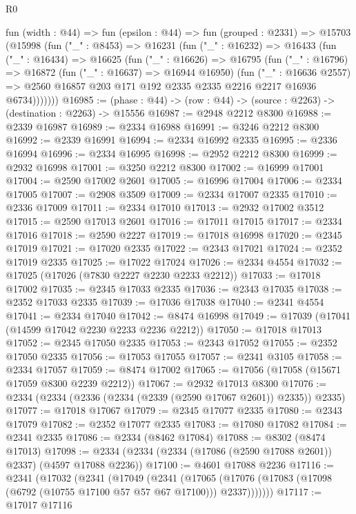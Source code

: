 \begin{lexlean}{R0}
\begin{coremodule}
  fun (width : @44) =>
  fun (epsilon : @44) =>
  fun (grouped : @2331) =>
  @15703
    (@15998
      (fun ("_" : @8453) =>
      @16231
        (fun ("_" : @16232) =>
        @16433
          (fun ("_" : @16434) =>
          @16625
            (fun ("_" : @16626) =>
            @16795
              (fun ("_" : @16796) =>
              @16872
                (fun ("_" : @16637) => @16944 @16950)
                (fun ("_" : @16636 @2557) =>
                @2560 @16857 @203 @171 @192 @2335 @2335 @2216 @2217 @16936 @6734)))))))
@16985 := (phase : @44) -> (row : @44) -> (source : @2263) -> (destination : @2263) -> @15556
@16987 := @2948 @2212 @8300
@16988 := @2339 @16987
@16989 := @2334 @16988
@16991 := @3246 @2212 @8300
@16992 := @2339 @16991
@16994 := @2334 @16992 @2335
@16995 := @2336 @16994
@16996 := @2334 @16995
@16998 := @2952 @2212 @8300
@16999 := @2932 @16998
@17001 := @3250 @2212 @8300
@17002 := @16999 @17001
@17004 := @2590 @17002 @2601
@17005 := @16996 @17004
@17006 := @2334 @17005
@17007 := @2908 @3509
@17009 := @2334 @17007 @2335
@17010 := @2336 @17009
@17011 := @2334 @17010
@17013 := @2932 @17002 @3512
@17015 := @2590 @17013 @2601
@17016 := @17011 @17015
@17017 := @2334 @17016
@17018 := @2590 @2227
@17019 := @17018 @16998
@17020 := @2345 @17019
@17021 := @17020 @2335
@17022 := @2343 @17021
@17024 := @2352 @17019 @2335
@17025 := @17022 @17024
@17026 := @2334 @4554
@17032 := @17025 (@17026 (@7830 @2227 @2230 @2233 @2212))
@17033 := @17018 @17002
@17035 := @2345 @17033 @2335
@17036 := @2343 @17035
@17038 := @2352 @17033 @2335
@17039 := @17036 @17038
@17040 := @2341 @4554
@17041 := @2334 @17040
@17042 := @8474 @16998
@17049 := @17039 (@17041 (@14599 @17042 @2230 @2233 @2236 @2212))
@17050 := @17018 @17013
@17052 := @2345 @17050 @2335
@17053 := @2343 @17052
@17055 := @2352 @17050 @2335
@17056 := @17053 @17055
@17057 := @2341 @3105
@17058 := @2334 @17057
@17059 := @8474 @17002
@17065 := @17056 (@17058 (@15671 @17059 @8300 @2239 @2212))
@17067 := @2932 @17013 @8300
@17076 := @2334 (@2334 (@2336 (@2334 (@2339 (@2590 @17067 @2601)) @2335)) @2335)
@17077 := @17018 @17067
@17079 := @2345 @17077 @2335
@17080 := @2343 @17079
@17082 := @2352 @17077 @2335
@17083 := @17080 @17082
@17084 := @2341 @2335
@17086 := @2334 (@8462 @17084)
@17088 := @8302 (@8474 @17013)
@17098 := @2334 (@2334 (@2334 (@17086 (@2590 @17088 @2601)) @2337) (@4597 @17088 @2236))
@17100 := @4601 @17088 @2236
@17116 := @2341
    (@17032
      (@2341
        (@17049
          (@2341
            (@17065 (@17076 (@17083 (@17098 (@6792 (@10755 @17100 @57 @57 @67 @17100))) @2337)))))))
@17117 := @17017 @17116

\end{coremodule}
\end{lexlean}
